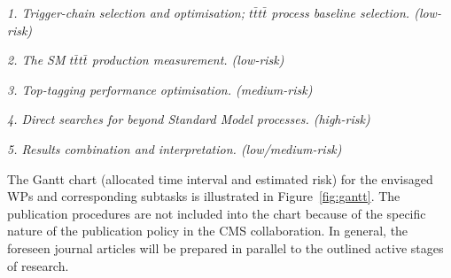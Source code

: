 \noindent\textit{1. Trigger-chain selection and optimisation; $t\bar{t}t\bar{t}$ process baseline selection. (low-risk)}\\

\newline
%
%

\noindent\textit{2. The SM $t\bar{t}t\bar{t}$ production measurement. (low-risk)}\\

\newline


\noindent\textit{3. Top-tagging performance optimisation. (medium-risk)}\\

\newline


\noindent\textit{4. Direct searches for beyond Standard Model processes. (high-risk)}\\

\newline


\textit{5. Results combination and interpretation. (low/medium-risk)}\\

\newline

The Gantt chart (allocated time interval and estimated risk) for the envisaged WPs and corresponding subtasks is illustrated in Figure~\ref{fig:gantt}. The publication procedures are not included into the chart because of the specific nature of the publication policy in the CMS collaboration. In general, the foreseen journal articles will be prepared in parallel to the outlined active stages of research.
